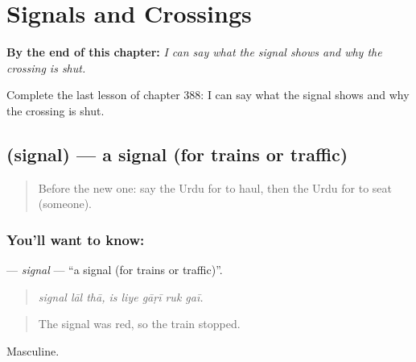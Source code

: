 
\chapter{Signals and Crossings}
\label{ch:ur-signals-and-crossings}

\begin{chapteropening}
\textbf{By the end of this chapter:} \emph{I can say what the signal shows and why the crossing is shut.}

Complete the last lesson of chapter 388: I can say what the signal shows and why the crossing is shut.
\end{chapteropening}

\section[\texorpdfstring{\ur{سگنل} (signal)}{سگنل (signal)}]{ (signal) — a signal (for trains or traffic)}

\label{lesson:UR-C388-signal}



\begin{quote}
Before the new one: say the Urdu for to haul, then the Urdu for to seat (someone).
\end{quote}

\subsection*{You'll want to know: }
\textbf{} — \emph{signal} — \textquotedblleft{}a signal (for trains or traffic)\textquotedblright{}.

\begin{quote}
       
\end{quote}

\begin{quote}
\emph{signal lāl thā, is liye gāṛī ruk gaī.}
\end{quote}

\begin{quote}
The signal was red, so the train stopped.
\end{quote}

Masculine.

